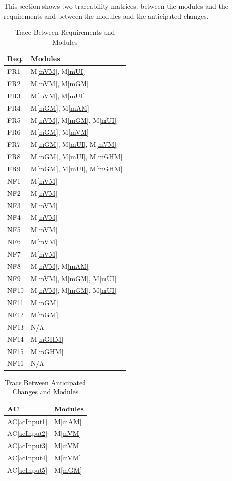 \documentclass[12pt, titlepage]{article}
\newcommand{\acref}[1]{AC\ref{#1}}
\newcommand{\mref}[1]{M\ref{#1}}
\begin{document}
{This section shows two traceability matrices: between the modules and the
requirements and between the modules and the anticipated changes.

\begin{table}[htp]
\centering
\begin{tabular}{p{} p{}}
\toprule
\textbf{Req.} & \textbf{Modules}\\
\midrule
FR1 & \mref{mVM}, \mref{mUI}\\
FR2 & \mref{mVM}, \mref{mGM}\\
FR3 & \mref{mVM}, \mref{mUI}\\
FR4 & \mref{mGM}, \mref{mAM}\\
FR5 & \mref{mVM}, \mref{mGM}, \mref{mUI}\\
FR6 & \mref{mGM}, \mref{mVM}\\
FR7 & \mref{mGM}, \mref{mUI}, \mref{mVM}\\
FR8 & \mref{mGM}, \mref{mUI}, \mref{mGHM} \\
FR9 & \mref{mGM}, \mref{mUI}, \mref{mGHM} \\
NF1 & \mref{mVM}\\
NF2 & \mref{mVM}\\
NF3 & \mref{mVM}\\
NF4 & \mref{mVM}\\
NF5 & \mref{mVM}\\
NF6 & \mref{mVM}\\
NF7 & \mref{mVM}\\
NF8 & \mref{mVM}, \mref{mAM}\\
NF9 & \mref{mVM}, \mref{mGM}, \mref{mUI} \\
NF10& \mref{mVM}, \mref{mGM}, \mref{mUI} \\
NF11 & \mref{mGM} \\
NF12 & \mref{mGM} \\
NF13 &   N/A\\
NF14 &\mref{mGHM}\\
NF15&\mref{mGHM}\\
NF16 &   N/A\\

\bottomrule
\end{tabular}
\caption{Trace Between Requirements and Modules}
\label{TblRT}
\end{table}

\begin{table}[H]
\centering
\begin{tabular}{p{} p{}}
\toprule
\textbf{AC} & \textbf{Modules}\\
\midrule
\acref{acInput1} & \mref{mAM}\\
\acref{acInput2} & \mref{mVM}\\
\acref{acInput3} & \mref{mVM}\\
\acref{acInput4} & \mref{mVM}\\
\acref{acInput5} & \mref{mGM}\\
\bottomrule
\end{tabular}
\caption{Trace Between Anticipated Changes and Modules}
\label{TblACT}
\end{table}

}
\end{document}
